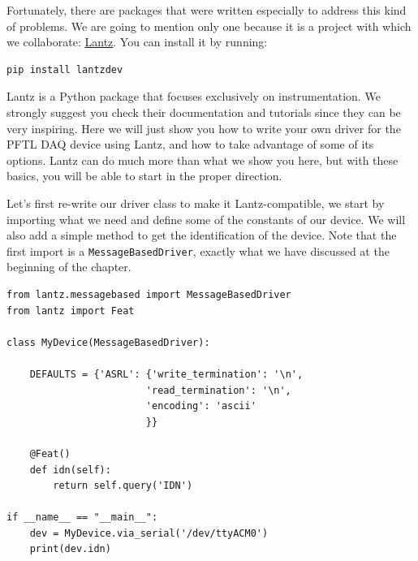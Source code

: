 Fortunately, there are packages that were written especially to address this kind of problems. We are going to mention only one because it is
a project with which we collaborate: \href{https://github.com/lantzproject/lantz}{Lantz}. You can install it
by running:

\begin{verbatim}
pip install lantzdev
\end{verbatim}


Lantz is a Python package that focuses exclusively on instrumentation. We strongly suggest you check their documentation and tutorials since they
can be very inspiring. Here we will just show you how to write your own
driver for the {PFTL DAQ} device using Lantz, and how to take
advantage of some of its options. Lantz can do much more than what we show you here, but with these basics, you will be able to start in the
proper direction.

Let's first re-write our driver class to make it Lantz-compatible, we
start by importing what we need and define some of the constants of our
device. We will also add a simple method to get the identification of the
device. Note that the first import is a \texttt{MessageBasedDriver},
exactly what we have discussed at the beginning of the chapter.

\begin{verbatim}
from lantz.messagebased import MessageBasedDriver
from lantz import Feat

class MyDevice(MessageBasedDriver):

    DEFAULTS = {'ASRL': {'write_termination': '\n',
                        'read_termination': '\n',
                        'encoding': 'ascii'
                        }}

    @Feat()
    def idn(self):
        return self.query('IDN')

if __name__ == "__main__":
    dev = MyDevice.via_serial('/dev/ttyACM0')
    print(dev.idn)
\end{verbatim}

